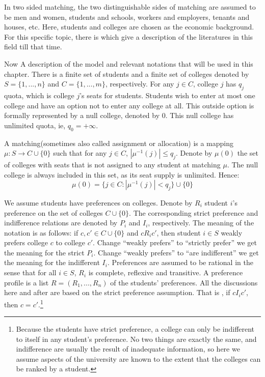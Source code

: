 In two sided matching, the two
distinguishable sides of matching are assumed to be men and women,
students and schools, workers and employers, tenants and houses,
etc. Here, students and colleges are chosen as the economic
background. For this specific topic, there
is \parencite{Sonmez2003}  which give a description of the literatures
in this field till that time. 

Now A description of the model and relevant notations that will be used in this chapter. There is a finite set of students and a finite set of colleges denoted by  $S = \{1,...,n\}$ and $C = \{1,...,m\}$, respectively. For any $j \in C$, college $j$ has $q_j$ quota, which is college $j$'s seats for students. Students wish to enter at most one college and have an option not to enter any college at all. This outside option is formally represented by a null college, denoted by $0$. This null college has unlimited quota, ie, $q_0 = + \infty$. 

A matching(sometimes also called assignment or allocation) is a
mapping $\mu : S \rightarrow C\cup\{0\}$ such that for any $j \in C$,
$|\mu^{-1}(j)| \leq q_j$. Denote by $\mu(0)$ the set of colleges with
seats that is not assigned to any student at matching $\mu$. The null
college is always included in this set, as its seat supply is
unlimited. Hence:
\[ \mu(0) = \{j \in C : |\mu^{-1}(j)| < q_j\}\cup \{0\}\]


We assume students have preferences on colleges.  Denote by $R_i$ student $i$'s preference on the set of colleges $C \cup \{0\}$. The corresponding strict preference and indifference relations are denoted by $P_i$ and $I_i$, respectively. The meaning of the notation is as follows: if $c,c'\in C \cup \{0\}$ and $c R_i c'$, then student $i \in S$ weakly prefers college $c$ to college $c'$. Change ``weakly prefers'' to ``strictly prefer'' we get the meaning for the strict $P_i$. Change ``weakly prefers'' to ``are indifferent'' we get the meaning for the indifferent $I_i$. Preferences are assumed to be rational in the sense that for all $i \in S$, $R_i$ is complete, reflexive and transitive. A preference profile is a list $ R = (R_1,...,R_n)$ of the students' preferences. All the discussions here and after are based on the strict preference assumption. That is , if $c I_i c'$, then $c=c'$.\footnote{Because the students have strict preference, a college can only be indifferent to itself in any student's preference. No two things are exactly the same, and indifference are usually the result of inadequate information, so here we assume aspects of the university are known to the extent that the colleges can be ranked by a student.}

